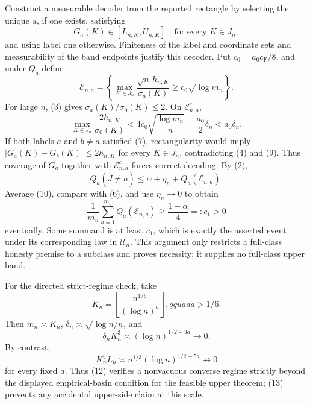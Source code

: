 Construct a measurable decoder from the reported rectangle by selecting the unique \(a\), if one exists, satisfying
\[
 G_a(K)\in[L_{n,K},U_{n,K}]\quad\text{for every }K\in J_n,                              \tag{7}
\]
and using label one otherwise.  Finiteness of the label and coordinate sets and measurability of the band endpoints justify this decoder.  Put \(c_0=a_0c_{\mathrm F}/8\), and under \(Q_a\) define
\[
 \mathcal E_{n,a}=\left\{\max_{K\in J_n}
 \frac{\sqrt n\,h_{n,K}}{\sigma_a(K)}\geq c_0\sqrt{\log m_n}\right\}.                \tag{8}
\]
For large \(n\), (3) gives \(\sigma_a(K)/\sigma_0(K)\leq2\).  On \(\mathcal E_{n,a}^c\),
\[
 \max_{K\in J_n}\frac{2h_{n,K}}{\sigma_0(K)}
 <4c_0\sqrt{\frac{\log m_n}{n}}=\frac{a_0}{2}\delta_n<a_0\delta_n.                    \tag{9}
\]
If both labels \(a\) and \(b\ne a\) satisfied (7), rectangularity would imply \(|G_a(K)-G_b(K)|\leq2h_{n,K}\) for every \(K\in J_n\), contradicting (4) and (9).  Thus coverage of \(G_a\) together with \(\mathcal E_{n,a}^c\) forces correct decoding.  By (2),
\[
 Q_a(\widehat J\ne a)\leq\alpha+\eta_n+Q_a(\mathcal E_{n,a}).                           \tag{10}
\]
Average (10), compare with (6), and use \(\eta_n\to0\) to obtain
\[
 \frac1{m_n}\sum_{a=1}^{m_n}Q_a(\mathcal E_{n,a})\geq\frac{1-\alpha}{4}=:c_1>0          \tag{11}
\]
eventually.  Some summand is at least \(c_1\), which is exactly the asserted event under its corresponding law in \(\mathcal U_n\).  This argument only restricts a full-class honesty premise to a subclass and proves necessity; it supplies no full-class upper band.

For the directed strict-regime check, take
\[
 K_n=\left\lfloor\frac{n^{1/6}}{(\log n)^a}\right\rfloor,qquad a>1/6.
\]
Then \(m_n\asymp K_n\), \(\delta_n\asymp\sqrt{\log n/n}\), and
\[
 \delta_nK_n^3\asymp(\log n)^{1/2-3a}\to0.                                              \tag{12}
\]
By contrast,
\[
 K_n^5L_n\asymp n^{1/3}(\log n)^{1/2-5a}\not\to0                                      \tag{13}
\]
for every fixed \(a\).  Thus (12) verifies a nonvacuous converse regime strictly beyond the displayed empirical-basin condition for the feasible upper theorem; (13) prevents any accidental upper-side claim at this scale.